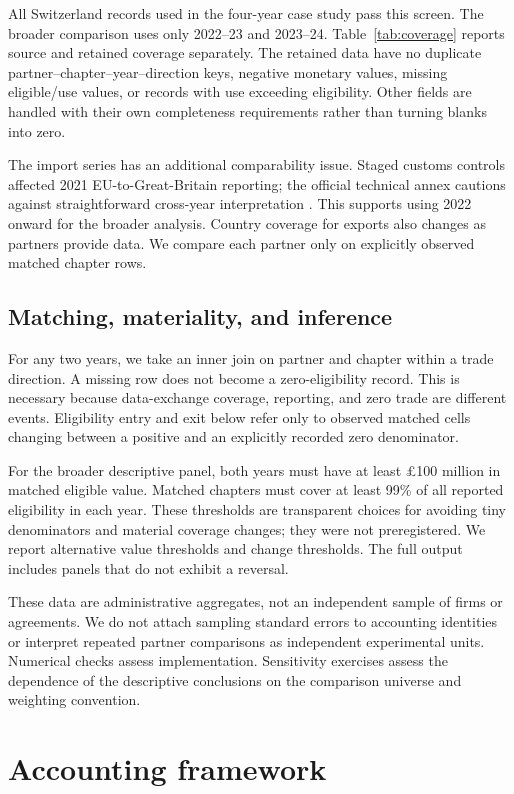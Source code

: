 \documentclass[11pt,a4paper]{article}
\begin{document}
All Switzerland records used in the four-year case study pass this screen. The broader comparison uses only 2022--23 and 2023--24. Table~\ref{tab:coverage} reports source and retained coverage separately. The retained data have no duplicate partner--chapter--year--direction keys, negative monetary values, missing eligible/use values, or records with use exceeding eligibility. Other fields are handled with their own completeness requirements rather than turning blanks into zero.

The import series has an additional comparability issue. Staged customs controls affected 2021 EU-to-Great-Britain reporting; the official technical annex cautions against straightforward cross-year interpretation \citep{dbtannex2026}. This supports using 2022 onward for the broader analysis. Country coverage for exports also changes as partners provide data. We compare each partner only on explicitly observed matched chapter rows.

\subsection{Matching, materiality, and inference}
For any two years, we take an inner join on partner and chapter within a trade direction. A missing row does not become a zero-eligibility record. This is necessary because data-exchange coverage, reporting, and zero trade are different events. Eligibility entry and exit below refer only to observed matched cells changing between a positive and an explicitly recorded zero denominator.

For the broader descriptive panel, both years must have at least \pounds100 million in matched eligible value. Matched chapters must cover at least 99\% of all reported eligibility in each year. These thresholds are transparent choices for avoiding tiny denominators and material coverage changes; they were not preregistered. We report alternative value thresholds and change thresholds. The full output includes panels that do not exhibit a reversal.

These data are administrative aggregates, not an independent sample of firms or agreements. We do not attach sampling standard errors to accounting identities or interpret repeated partner comparisons as independent experimental units. Numerical checks assess implementation. Sensitivity exercises assess the dependence of the descriptive conclusions on the comparison universe and weighting convention.

\section{Accounting framework}
\end{document}
